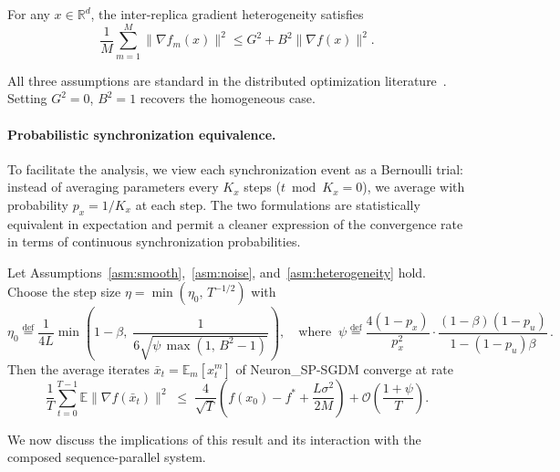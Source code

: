 \documentclass{article}
\begin{document}
\begin{assumption}
\label{asm:heterogeneity}
For any $x \in \mathbb{R}^d$, the inter-replica gradient heterogeneity
satisfies
\begin{equation}
\frac{1}{M} \sum_{m=1}^{M} \|\nabla f_m(x)\|^2 \leq G^2 + B^2
\|\nabla f(x)\|^2.
\end{equation}
\end{assumption}

All three assumptions are standard in the distributed optimization
literature~\citep{yu2019linear,karimireddy2020scaffold,wang2021field,yuan2022revisiting}.
Setting $G^2 = 0$, $B^2 = 1$ recovers the homogeneous case.

\paragraph{Probabilistic synchronization equivalence.}
To facilitate the analysis, we view each synchronization event as a
Bernoulli trial: instead of averaging parameters every $K_x$ steps
($t \bmod K_x = 0$), we average with probability $p_x = 1/K_x$ at each
step. The two formulations are statistically equivalent in expectation and
permit a cleaner expression of the convergence rate in terms of continuous
synchronization probabilities.

\begin{theorem}
\label{thm:sgdm}
Let Assumptions~\ref{asm:smooth},~\ref{asm:noise},
and~\ref{asm:heterogeneity} hold. Choose the step size
$\eta = \min(\eta_0,\, T^{-1/2})$ with
\begin{equation}
\eta_0 \stackrel{\mathrm{def}}{=}
\frac{1}{4L} \min\!\left(1 - \beta,\;
\frac{1}{6\sqrt{\psi\,\max(1,\, B^2 - 1)}}\right),
\quad \text{where}\;\;
\psi \stackrel{\mathrm{def}}{=}
\frac{4(1-p_x)}{p_x^2}
\cdot \frac{(1-\beta)(1-p_u)}{1-(1-p_u)\beta}\,.
\label{eq:step_size}
\end{equation}
Then the average iterates $\bar{x}_t = \mathbb{E}_m[x^m_t]$ of
Neuron\_SP-SGDM converge at rate
\begin{equation}
\frac{1}{T}\sum_{t=0}^{T-1}
\mathbb{E}\|\nabla f(\bar{x}_t)\|^2
\;\leq\; \frac{4}{\sqrt{T}}
\left(f(x_0) - f^* + \frac{L\sigma^2}{2M}\right)
+ \mathcal{O}\!\left(\frac{1+\psi}{T}\right).
\label{eq:rate}
\end{equation}
\end{theorem}

We now discuss the implications of this result and its interaction with
the composed sequence-parallel system.
\end{document}
